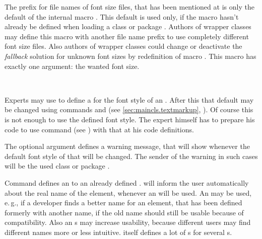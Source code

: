 \begin{Declaration}
\end{Declaration}
%
The prefix  for file names of font size files, that has been
mentioned at
 is only the default of the
internal macro . This
default is used only, if the macro hasn't already be defined when loading a
\KOMAScript{} class or package . Authors of wrapper classes
may define this macro with another file name prefix to use completely
different font size files. Also authors of wrapper classes
could change or deactivate the \emph{fallback} solution for unknown font sizes
by redefinition of macro
%
. This macro has exactly one argument: the wanted
font size.%
%
%

\begin{Declaration}
                     \\
\end{Declaration}
%
%
Experts may use  to define a  for the font
style of an . After this that default may be changed using
commands  and  (see
\autoref{sec:maincls.textmarkup},
). Of course this is not enough to
use the defined font style. The expert himself has to prepare his code to use
command
 (see
) with that  at his
code definitions.

The optional argument  defines a warning message,
that \KOMAScript{} will show whenever the default font style of that
 will be changed. The sender of the warning in such cases will
be the used \KOMAScript{} class or package .

Command  defines an  to an already
defined . \KOMAScript{} will inform the user automatically
about the real name of the element, whenever an  will be
used. An  may be used, e.\,g., if a
developer finds a better name for an element, that has been defined formerly
with another name, if the old name should still be usable because of
compatibility. Also an s may increase usability, because
different users may find different names more or less intuitive. \KOMAScript{}
itself defines a lot of s for several s.
%
%
%

